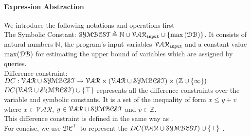 \paragraph*{Expression Abstraction}
We introduce the following notations and operations first
\\
The Symbolic Constant:  $\mathcal{SYMBCST} \triangleq \mathbb{N} \cup \mathcal{VAR}_{\mathtt{input}} \cup \{\max{(\mathcal{DB})}\} $.
It consists of 
natural numbers $\mathbb{N}$,
the program's input variables $\mathcal{VAR}_{\mathtt{input}}$ 
and a constant value $\max(\mathcal{DB})$ for estimating the upper bound of variables which are
assigned by queries.
\\
Difference constraint: $DC : \mathcal{VAR} \cup \mathcal{SYMBCST} \to \mathcal{\mathcal{VAR} \times (\mathcal{VAR} \cup \mathcal{SYMBCST}) } \times (\mathbb{Z} \cup \{\infty\})$
 \\
$DC(\mathcal{VAR}  \cup \mathcal{SYMBCST}) \cup \{\top\}$ represents all the difference constraints over the 
variable and symbolic constants.
It is a set of the inequality of form $x \leq y + v$ where $x \in \mathcal{VAR} $, 
$y \in \mathcal{VAR}  \cup \mathcal{SYMBCST}$ and $v \in \mathbb{Z}$. 
\\
This difference constraint is defined in the same way as
\cite{sinn2017complexity}. 
\\
For concise, we use $\mathcal{DC}^{\top}$ to represent the $DC(\mathcal{VAR}  \cup \mathcal{SYMBCST}) \cup \{\top\}$ .
\\
